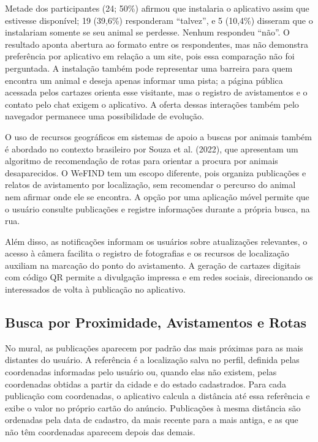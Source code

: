 Metade dos participantes (24; 50\%) afirmou que instalaria o aplicativo assim que estivesse disponível; 19 (39,6\%) responderam ``talvez'', e 5 (10,4\%) disseram que o instalariam somente se seu animal se perdesse. Nenhum respondeu ``não''. O resultado aponta abertura ao formato entre os respondentes, mas não demonstra preferência por aplicativo em relação a um site, pois essa comparação não foi perguntada. A instalação também pode representar uma barreira para quem encontra um animal e deseja apenas informar uma pista; a página pública acessada pelos cartazes orienta esse visitante, mas o registro de avistamentos e o contato pelo chat exigem o aplicativo. A oferta dessas interações também pelo navegador permanece uma possibilidade de evolução.

O uso de recursos geográficos em sistemas de apoio a buscas por animais também é abordado no contexto brasileiro por Souza et al. (2022), que apresentam um algoritmo de recomendação de rotas para orientar a procura por animais desaparecidos. O WeFIND tem um escopo diferente, pois organiza publicações e relatos de avistamento por localização, sem recomendar o percurso do animal nem afirmar onde ele se encontra. A opção por uma aplicação móvel permite que o usuário consulte publicações e registre informações durante a própria busca, na rua.

Além disso, as notificações informam os usuários sobre atualizações relevantes, o acesso à câmera facilita o registro de fotografias e os recursos de localização auxiliam na marcação do ponto do avistamento. A geração de cartazes digitais com código QR permite a divulgação impressa e em redes sociais, direcionando os interessados de volta à publicação no aplicativo.

\subsection{Busca por Proximidade, Avistamentos e Rotas}\label{sec:busca_proximidade}\label{sec:avistamentos}\label{sec:rota}

No mural, as publicações aparecem por padrão das mais próximas para as mais distantes do usuário. A referência é a localização salva no perfil, definida pelas coordenadas informadas pelo usuário ou, quando elas não existem, pelas coordenadas obtidas a partir da cidade e do estado cadastrados. Para cada publicação com coordenadas, o aplicativo calcula a distância até essa referência e exibe o valor no próprio cartão do anúncio. Publicações à mesma distância são ordenadas pela data de cadastro, da mais recente para a mais antiga, e as que não têm coordenadas aparecem depois das demais.

